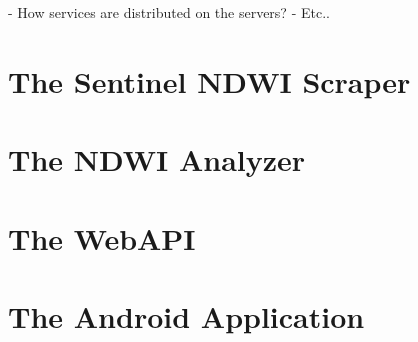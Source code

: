 - How services are distributed on the servers?
- Etc..

\section{The Sentinel NDWI Scraper}

\section{The NDWI Analyzer}

\section{The WebAPI}

\section{The Android Application}

